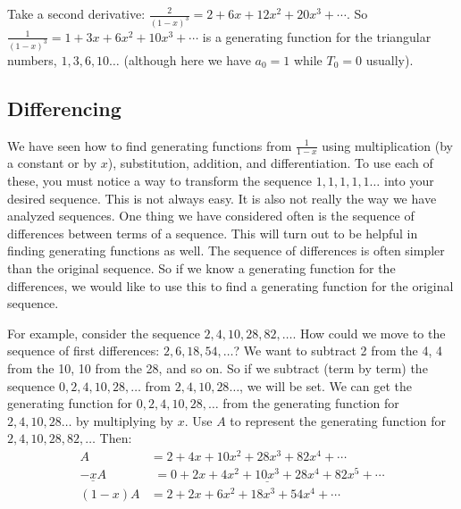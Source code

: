 \documentclass[10pt,]{book}
\theoremstyle{plain}
\theoremstyle{definition}
\theoremstyle{definition}
\theoremstyle{definition}
\numberwithin{equation}{chapter}
\newcommand{\amp}{ & }
\begin{document}
Take a second derivative: \(\frac{2}{(1-x)^3} = 2 + 6x + 12x^2 + 20x^3 + \cdots\). So \(\frac{1}{(1-x)^3} = 1 + 3x + 6x^2 + 10x^3 + \cdots\) is a generating function for the triangular numbers, \(1,3,6,10\ldots\) (although here we have \(a_0 = 1\) while \(T_0 = 0\) usually).
%
\typeout{************************************************}
\typeout{************************************************}
\subsection[Differencing]{Differencing}\label{subsection-43}

We have seen how to find generating functions from \(\frac{1}{1-x}\) using multiplication (by a constant or by \(x\)), substitution, addition, and differentiation. To use each of these, you must notice a way to transform the sequence \(1,1,1,1,1\ldots\) into your desired sequence. This is not always easy. It is also not really the way we have analyzed sequences. One thing we have considered often is the sequence of differences between terms of a sequence. This will turn out to be helpful in finding generating functions as well. The sequence of differences is often simpler than the original sequence. So if we know a generating function for the differences, we would like to use this to find a generating function for the original sequence.
%
\par

For example, consider the sequence \(2, 4, 10, 28, 82, \ldots\). How could we move to the sequence of first differences: \(2, 6, 18, 54,\ldots\)? We want to subtract 2 from the 4, 4 from the 10, 10 from the 28, and so on. So if we subtract (term by term) the sequence \(0, 2, 4, 10, 28,\ldots\) from \(2, 4, 10, 28\ldots\), we will be set. We can get the generating function for \(0,2,4,10,28,\ldots\) from the generating function for \(2,4,10,28\ldots\) by multiplying by \(x\). Use \(A\) to represent the generating function for \(2, 4, 10, 28, 82, \ldots\) Then:
\begin{align*}
  A \amp  = 2 + 4x + 10x^2 +28x^3 + 82x^4 + \cdots\\
  \underline{-xA} \amp  \underline{\,\,= 0 + 2x + 4x^2 + 10x^3 + 28 x^4 + 82x^5 + \cdots}\\
  (1-x)A \amp  = 2 + 2x + 6x^2 + 18x^3 + 54x^4 + \cdots
\end{align*}
%
\par
\end{document}
